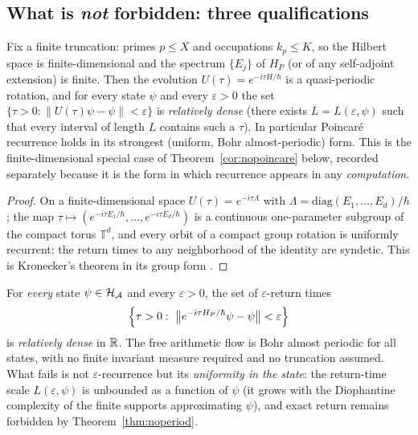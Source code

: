 \subsection{What is \emph{not} forbidden: three qualifications}

\begin{corollary}\label{cor:truncatedrecurrence}
Fix a finite truncation: primes $p\leq X$ and occupations $k_{p}\leq K$, so the Hilbert space
is finite-dimensional and the spectrum $\{E_{j}\}$ of $H_{P}$ (or of any self-adjoint
extension) is finite. Then the evolution $U(\tau)=e^{-i\tau H/\hbar}$ is a quasi-periodic
rotation, and for every state $\psi$ and every $\varepsilon>0$ the set
$\{\tau>0:\|U(\tau)\psi-\psi\|<\varepsilon\}$ is \emph{relatively dense} (there exists
$L=L(\varepsilon,\psi)$ such that every interval of length $L$ contains such a $\tau$). In
particular Poincar\'e recurrence holds in its strongest (uniform, Bohr almost-periodic) form.
This is the finite-dimensional special case of Theorem~\ref{cor:nopoincare} below, recorded
separately because it is the form in which recurrence appears in any \emph{computation}.
\end{corollary}

\begin{proof}
On a finite-dimensional space $U(\tau)=e^{-i\tau\Lambda}$ with
$\Lambda=\mathrm{diag}(E_{1},\dots,E_{d})/\hbar$; the map $\tau\mapsto
(e^{-i\tau E_{1}/\hbar},\dots,e^{-i\tau E_{d}/\hbar})$ is a continuous one-parameter
subgroup of the compact torus $\mathbb{T}^{d}$, and every orbit of a compact group rotation is
uniformly recurrent: the return times to any neighborhood of the identity are syndetic. This
is Kronecker's theorem in its group form \cite{hardywright2008}.
\end{proof}

\begin{theorem}\label{cor:nopoincare}
For \emph{every} state $\psi\in\mathcal{H}_{\mathcal{A}}$ and every $\varepsilon>0$, the set of
$\varepsilon$-return times
\begin{equation}
\Bigl\{\tau>0:\ \bigl\|e^{-i\tau H_{P}/\hbar}\psi-\psi\bigr\|<\varepsilon\Bigr\}
\end{equation}
is \emph{relatively dense} in $\mathbb{R}$. The free arithmetic flow is Bohr almost periodic for
all states, with no finite invariant measure required and no truncation assumed. What fails
is not $\varepsilon$-recurrence but its \emph{uniformity in the state}: the return-time
scale $L(\varepsilon,\psi)$ is unbounded as a function of $\psi$ (it grows with the
Diophantine complexity of the finite supports approximating $\psi$), and exact return
remains forbidden by Theorem~\ref{thm:noperiod}.
\end{theorem}

